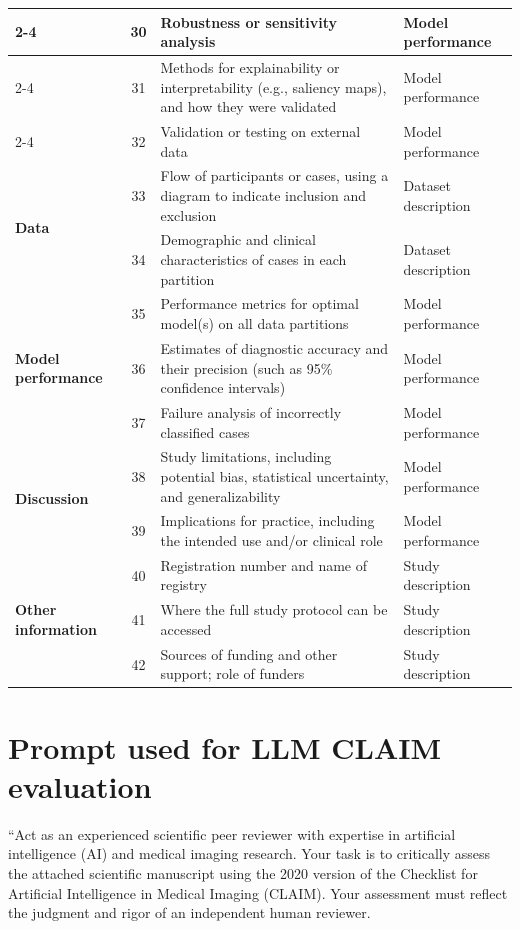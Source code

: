 \begin{longtable}{|p{2cm}|c|p{7.2cm}|p{2.8cm}|}
\cline{2-4}
 & 30 & Robustness or sensitivity analysis & Model performance \\
\cline{2-4}
 & 31 & Methods for explainability or interpretability (e.g., saliency maps), and how they were validated & Model performance \\
\cline{2-4}
 & 32 & Validation or testing on external data & Model performance \\
\hline
\multirow{2}{=}{\textbf{Data}}
 & 33 & Flow of participants or cases, using a diagram to indicate inclusion and exclusion & Dataset description \\
\cline{2-4}
 & 34 & Demographic and clinical characteristics of cases in each partition & Dataset description \\
\hline
\multirow{3}{=}{\textbf{Model performance}}
 & 35 & Performance metrics for optimal model(s) on all data partitions & Model performance \\
\cline{2-4}
 & 36 & Estimates of diagnostic accuracy and their precision (such as 95\% confidence intervals) & Model performance \\
\cline{2-4}
 & 37 & Failure analysis of incorrectly classified cases & Model performance \\
\hline
\multirow{2}{=}{\textbf{Discussion}}
 & 38 & Study limitations, including potential bias, statistical uncertainty, and generalizability & Model performance \\
\cline{2-4}
 & 39 & Implications for practice, including the intended use and/or clinical role & Model performance \\
\hline
\multirow{3}{=}{\textbf{Other information}}
 & 40 & Registration number and name of registry & Study description \\
\cline{2-4}
 & 41 & Where the full study protocol can be accessed & Study description \\
\cline{2-4}
 & 42 & Sources of funding and other support; role of funders & Study description \\
\end{longtable}

\newpage
\section{Prompt used for LLM CLAIM evaluation}
\label{app:prompt}
“Act as an experienced scientific peer reviewer with expertise in artificial intelligence (AI) and medical imaging research. Your task is to critically assess the attached scientific manuscript using the 2020 version of the Checklist for Artificial Intelligence in Medical Imaging (CLAIM). Your assessment must reflect the judgment and rigor of an independent human reviewer.


